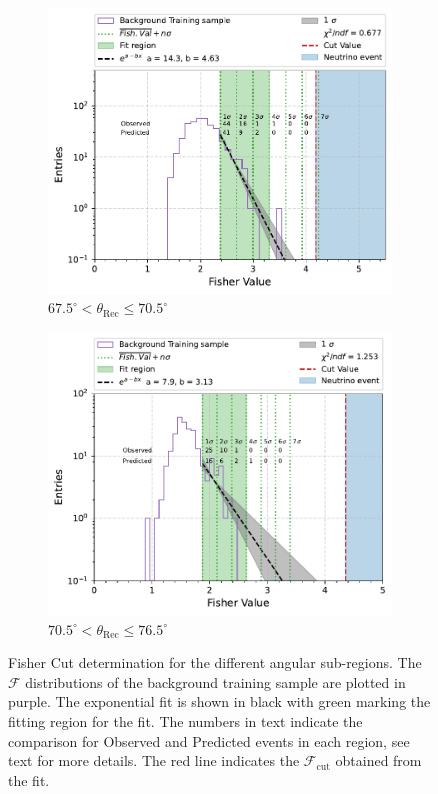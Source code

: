 \begin{figure}[h!]
    \begin{subfigure}[r]{.48\textwidth}
      \centering
      \includegraphics[width=\linewidth]{thesis_figures/Nu_analysis/Fisher_plots/Fisher_fit_region_67.5_70.5.pdf}
      \caption{$ 67.5^{\circ} <\theta_{\text{Rec}} \leq 70.5^{\circ}$}
    \end{subfigure}
    \hfill    
    \begin{subfigure}[r]{.48\textwidth}
      \centering
      \includegraphics[width=\linewidth]{thesis_figures/Nu_analysis/Fisher_plots/Fisher_fit_region_70.5_73.5.pdf}
      \caption{$ 70.5^{\circ} <\theta_{\text{Rec}} \leq 76.5^{\circ}$}
   \end{subfigure}
   \caption{Fisher Cut determination for the different angular sub-regions. The $\mathcal{F}$ distributions of the background training sample are plotted in purple. The exponential fit is shown in black with green marking the fitting region for the fit. The numbers in text indicate the comparison for Observed and Predicted events in each region, see text for more details. The red line indicates the $\mathcal{F}_{\text{cut}}$ obtained from the fit.}
    \label{fig:Fisher_cut}

\end{figure}

